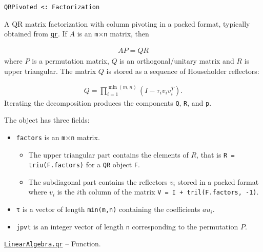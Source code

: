 \begin{adjustwidth}{2em}{0pt}


\begin{verbatim}
QRPivoted <: Factorization
\end{verbatim}

A QR matrix factorization with column pivoting in a packed format, typically obtained from \hyperlink{4122539696772350360}{\texttt{qr}}. If \(A\) is an \texttt{m}×\texttt{n} matrix, then

\begin{equation*}
\begin{split}A P = Q R\end{split}\end{equation*}
where \(P\) is a permutation matrix, \(Q\) is an orthogonal/unitary matrix and \(R\) is upper triangular. The matrix \(Q\) is stored as a sequence of Householder reflectors:

\begin{equation*}
\begin{split}Q = \prod_{i=1}^{\min(m,n)} (I - \tau_i v_i v_i^T).\end{split}\end{equation*}
Iterating the decomposition produces the components \texttt{Q}, \texttt{R}, and \texttt{p}.

The object has three fields:

\begin{itemize}
\item \texttt{factors} is an \texttt{m}×\texttt{n} matrix.

\begin{itemize}
\item The upper triangular part contains the elements of \(R\), that is \texttt{R = triu(F.factors)} for a \texttt{QR} object \texttt{F}.


\item The subdiagonal part contains the reflectors \(v_i\) stored in a packed format where \(v_i\) is the \(i\)th column of the matrix \texttt{V = I + tril(F.factors, -1)}.

\end{itemize}

\item \texttt{τ} is a vector of length \texttt{min(m,n)} containing the coefficients \(au_i\).


\item \texttt{jpvt} is an integer vector of length \texttt{n} corresponding to the permutation \(P\).

\end{itemize}


\end{adjustwidth}
\hypertarget{4122539696772350360}{} 
\hyperlink{4122539696772350360}{\texttt{LinearAlgebra.qr}}  -- {Function.}

